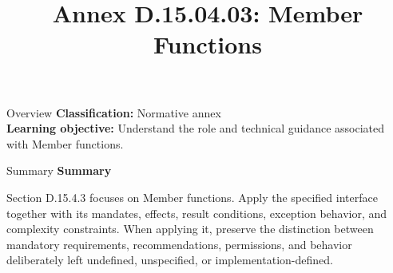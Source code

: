 \documentclass[10pt,letterpaper]{article}
\title{Annex D.15.04.03: Member Functions}
\author{}
\date{}
\begin{document}
\maketitle
\begin{CornellOverviewBox}{Overview}
\textbf{Classification:} Normative annex\\[2pt]
\textbf{Learning objective:} Understand the role and technical guidance associated with Member functions.
\end{CornellOverviewBox}\begin{CornellSummaryBox}{Summary}
{\sffamily\bfseries\color{Accent} Summary}\par\vspace{3pt}Section D.15.4.3 focuses on Member functions. Apply the specified interface together with its mandates, effects, result conditions, exception behavior, and complexity constraints. When applying it, preserve the distinction between mandatory requirements, recommendations, permissions, and behavior deliberately left undefined, unspecified, or implementation-defined.
\end{CornellSummaryBox}
\end{document}
